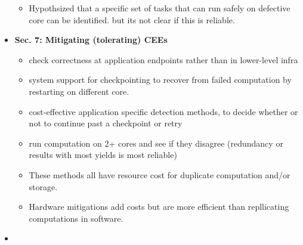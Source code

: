 \documentclass [12pt]{article}
\begin{document}
\begin{itemize}
\begin{itemize}
                \item Hypothsized that a specific set of tasks that can run safely on defective core can be identified. but its not clear if this is reliable. 
            \end{itemize}
            \item \textbf{Sec. 7: Mitigating (tolerating) CEEs}
                    \begin{itemize}
                        \item check correctness at application endpoints rather than in lower-level infra 
                        \item system support for checkpointing to recover from failed computation by restarting on different core. 
                        \item cost-effective application specific detection methods, to decide whether or not to continue past a checkpoint or retry 
                        \item run computation on 2+ cores and see if they disagree (redundancy or results with most yields is most reliable)
                        \item These methods all have resource cost for duplicate computation and/or storage.
                        \item  Hardware mitigations add costs but are more efficient than repllicating computations in software. 
                    \end{itemize}
            \item 
        \end{itemize}

\end{document}
